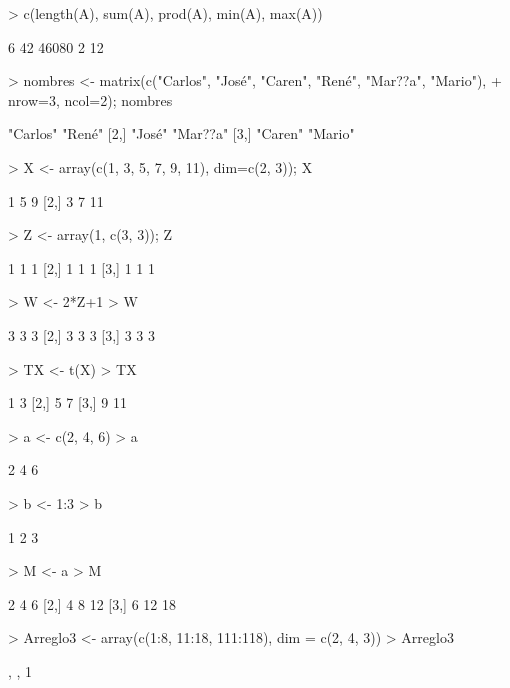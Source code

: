 \documentclass{article}
\begin{document}
\begin{Schunk}
\begin{Sinput}
> c(length(A), sum(A), prod(A), min(A), max(A))
\end{Sinput}
\begin{Soutput}
[1]     6    42 46080     2    12
\end{Soutput}
\begin{Sinput}
> nombres <- matrix(c("Carlos", "José", "Caren", "René", "Mar??a", "Mario"),
+                   nrow=3, ncol=2); nombres
\end{Sinput}
\begin{Soutput}
     [,1]     [,2]    
[1,] "Carlos" "René"  
[2,] "José"   "Mar??a"
[3,] "Caren"  "Mario" 
\end{Soutput}
\begin{Sinput}
> X <- array(c(1, 3, 5, 7, 9, 11), dim=c(2, 3)); X
\end{Sinput}
\begin{Soutput}
     [,1] [,2] [,3]
[1,]    1    5    9
[2,]    3    7   11
\end{Soutput}
\begin{Sinput}
> Z <- array(1, c(3, 3)); Z
\end{Sinput}
\begin{Soutput}
     [,1] [,2] [,3]
[1,]    1    1    1
[2,]    1    1    1
[3,]    1    1    1
\end{Soutput}
\begin{Sinput}
> W <- 2*Z+1
> W
\end{Sinput}
\begin{Soutput}
     [,1] [,2] [,3]
[1,]    3    3    3
[2,]    3    3    3
[3,]    3    3    3
\end{Soutput}
\begin{Sinput}
> TX <- t(X)
> TX
\end{Sinput}
\begin{Soutput}
     [,1] [,2]
[1,]    1    3
[2,]    5    7
[3,]    9   11
\end{Soutput}
\begin{Sinput}
> a <- c(2, 4, 6)
> a
\end{Sinput}
\begin{Soutput}
[1] 2 4 6
\end{Soutput}
\begin{Sinput}
> b <- 1:3
> b
\end{Sinput}
\begin{Soutput}
[1] 1 2 3
\end{Soutput}
\begin{Sinput}
> M <- a %
> M 
\end{Sinput}
\begin{Soutput}
     [,1] [,2] [,3]
[1,]    2    4    6
[2,]    4    8   12
[3,]    6   12   18
\end{Soutput}
\begin{Sinput}
> Arreglo3 <- array(c(1:8, 11:18, 111:118), dim = c(2, 4, 3))
> Arreglo3
\end{Sinput}
\begin{Soutput}
, , 1


\end{Soutput}
\end{Schunk}
\end{document}
